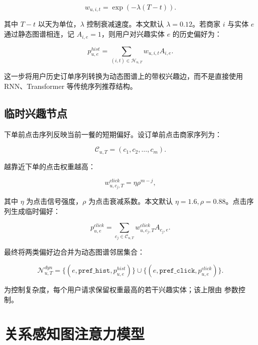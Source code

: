 \documentclass[UTF8,a4paper,12pt]{ctexart}
\begin{document}
\begin{equation}
w_{u,i,t}=\exp(-\lambda (T-t)).
\end{equation}

其中 $T-t$ 以天为单位，$\lambda$ 控制衰减速度。本文默认 $\lambda=0.12$。若商家 $i$ 与实体 $e$ 通过静态图谱相连，记 $A_{i,e}=1$，则用户对兴趣实体 $e$ 的历史偏好为：

\begin{equation}
p^{hist}_{u,e}=\sum_{(i,t)\in \mathcal{H}_{u,T}} w_{u,i,t} A_{i,e}.
\end{equation}

这一步将用户历史订单序列转换为动态图谱上的带权兴趣边，而不是直接使用 RNN、Transformer 等传统序列推荐结构。

\subsection{临时兴趣节点}

下单前点击序列反映当前一餐的短期偏好。设订单前点击商家序列为：

\begin{equation}
\mathcal{C}_{u,T}=(c_1,c_2,\ldots,c_m).
\end{equation}

越靠近下单的点击权重越高：

\begin{equation}
w^{click}_{u,c_j,T}=\eta \rho^{m-j},
\end{equation}

其中 $\eta$ 为点击信号强度，$\rho$ 为点击衰减系数。本文默认 $\eta=1.6,\rho=0.88$。点击序列生成临时偏好：

\begin{equation}
p^{click}_{u,e}=\sum_{c_j\in \mathcal{C}_{u,T}} w^{click}_{u,c_j,T} A_{c_j,e}.
\end{equation}

最终将两类偏好边合并为动态图谱邻居集合：

\begin{equation}
\mathcal{N}^{dyn}_{u,T}=\{(e,\texttt{pref\_hist},p^{hist}_{u,e})\}\cup
\{(e,\texttt{pref\_click},p^{click}_{u,e})\}.
\end{equation}

为控制复杂度，每个用户请求保留权重最高的若干兴趣实体；该上限由
 参数控制。

\section{关系感知图注意力模型}
\end{document}
